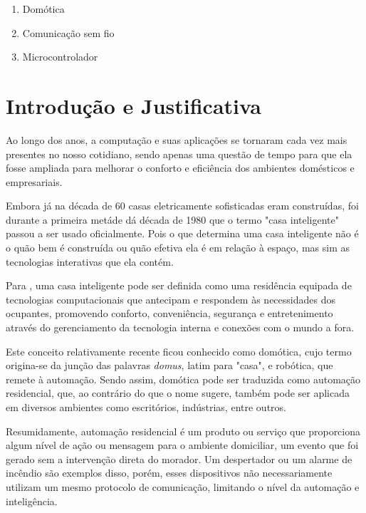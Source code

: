 \documentclass[
    12pt,               %
    a4paper,            %
    english,            %
    brazil,             %
    ]{article}
\begin{document}
        \begin{enumerate}
            \item Domótica
            \item Comunicação sem fio
            \item Microcontrolador
        \end{enumerate}


\section{Introdução e Justificativa}
Ao longo dos anos, a computação e suas aplicações se tornaram cada vez mais presentes no nosso cotidiano, sendo apenas
uma questão de tempo para que ela fosse ampliada para melhorar o conforto e eficiência dos ambientes domésticos e empresariais.

Embora já na década de 60 casas eletricamente sofisticadas eram construídas, foi durante a primeira metáde dá década de 1980 
que o termo "casa inteligente" passou a ser usado oficialmente. Pois o que determina uma casa inteligente não é o quão bem é construída
ou quão efetiva ela é em relação à espaço, mas sim as tecnologias interativas que ela contém.\cite{harper2003}

Para , uma casa inteligente pode ser definida como uma residência equipada de tecnologias computacionais que antecipam e
respondem às necessidades dos ocupantes, promovendo conforto, conveniência, segurança e entretenimento através do gerenciamento da tecnologia interna
e conexões com o mundo a fora.

Este conceito relativamente recente ficou conhecido como domótica, cujo termo origina-se da junção das palavras \textit{domus}, latim para "casa",
e robótica, que remete à automação. Sendo assim, domótica pode ser traduzida como automação residencial, que, ao contrário
do que o nome sugere, também pode ser aplicada em diversos ambientes como escritórios, indústrias, entre outros.

Resumidamente, automação residencial é um produto ou serviço que proporciona algum nível de ação ou mensagem para o ambiente domiciliar,
um evento que foi gerado sem a intervenção direta do morador. Um despertador ou um alarme de incêndio são exemplos disso, porém, esses dispositivos não necessariamente utilizam
um mesmo protocolo de comunicação, limitando o nível da automação e inteligência. \cite{riley2012}
\end{document}
